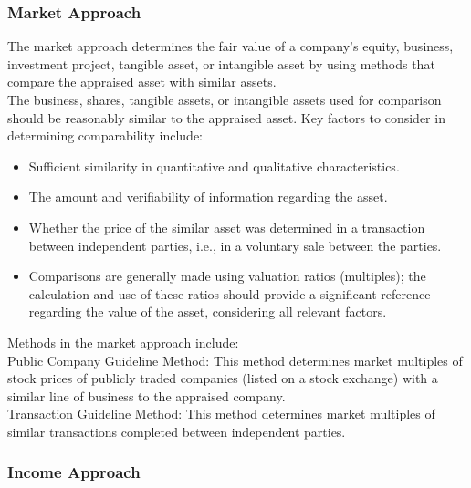 \subsubsection{Market Approach}

The market approach determines the fair value of a company's equity, business, investment project, tangible asset, or intangible asset by using methods that compare the appraised asset with similar assets.\\[10pt]

The business, shares, tangible assets, or intangible assets used for comparison should be reasonably similar to the appraised asset. Key factors to consider in determining comparability include:\\[10pt]

\begin{itemize}

\item Sufficient similarity in quantitative and qualitative characteristics.

\item The amount and verifiability of information regarding the asset.

\item Whether the price of the similar asset was determined in a transaction between independent parties, i.e., in a voluntary sale between the parties.

\item Comparisons are generally made using valuation ratios (multiples); the calculation and use of these ratios should provide a significant reference regarding the value of the asset, considering all relevant factors.

\end{itemize}

Methods in the market approach include:\\[10pt]

\textcolor{secundario}{Public Company Guideline Method:} This method determines market multiples of stock prices of publicly traded companies (listed on a stock exchange) with a similar line of business to the appraised company.\\[10pt]

\textcolor{secundario}{Transaction Guideline Method:} This method determines market multiples of similar transactions completed between independent parties.\\[10pt]

\subsubsection{Income Approach}

